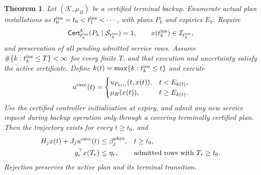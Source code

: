 \documentclass[preprint,12pt]{elsarticle}
\newtheorem{theorem}{Theorem}
\begin{document}
\begin{theorem}
\label{thm:backup-recursive-availability}
Let $(\mathcal K,\mu_B)$ be a certified terminal backup. Enumerate
actual plan installations as $t_0^{\rm ins}=t_0<t_1^{\rm ins}<\cdots$,
with plans $P_k$ and expiries $E_k$. Require
\[
\mathsf{Cert}^{\mathcal K}_{t_k^{\rm ins}}
 (P_k\mid\mathcal S_{t_k^{\rm ins}})=1,\qquad
x(t_k^{\rm ins})\in\mathcal I_{t_k^{\rm ins}},
\]
and preservation of all pending admitted service rows.
Assume $\#\{k:t_k^{\rm ins}\le T\}<\infty$ for every finite $T$, and
that execution and uncertainty satisfy the active certificate. Define
$k(t)=\max\{k:t_k^{\rm ins}\le t\}$ and execute
\begin{equation}
u^{\rm exec}(t)=\begin{cases}
u_{P_{k(t)}}(t,x(t)),&t<E_{k(t)},\\
\mu_B(x(t)),&t\ge E_{k(t)}.
\end{cases}
\label{eq:terminal-execution-policy}
\end{equation}
Use the certified controller initialization at expiry, and admit any new
service request during backup operation only through a covering terminally
certified plan. Then the trajectory exists for every $t\ge t_0$, and
\begin{equation}
\begin{aligned}
H_jx(t)+J_ju^{\rm exec}(t)&\le\beta_j^{\rm phys},
 &&t\ge t_0,\\
g_r^\top x(T_r)&\le\eta_r,
 &&\text{admitted rows with }T_r\ge t_0.
\end{aligned}
\label{eq:terminal-global-guarantee}
\end{equation}
Rejection preserves the active plan and its terminal transition.
\end{theorem}
\end{document}
